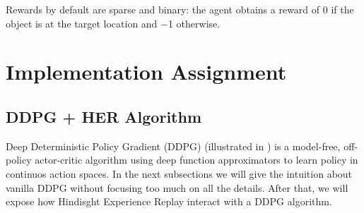 \documentclass[a4paper]{report}
\begin{document}
Rewards by default are sparse and binary: the agent obtains a reward of 0 if the object is at the target location and −1 otherwise. 
\chapter{Implementation Assignment \label{ddpgalgo}}

\section{DDPG + HER Algorithm}
Deep Deterministic Policy Gradient (DDPG) (illustrated in \cite{ddpg}) is a model-free, off-policy actor-critic algorithm using deep function approximators to learn policy in continuos action spaces. In the next subsections we will give the intuition about vanilla DDPG without focusing too much on all the details. After that, we will expose how Hindisght Experience Replay interact with a DDPG algorithm. 
\end{document}
